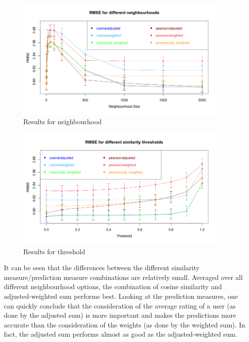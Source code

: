 \begin{figure}[!ht]
\centering
\includegraphics[width=400px]{./4-experiments/figures/USERBASED_N_V4.png}
\caption{Results for neighbourhood}
\label{f:userbasedn}
\end{figure}

\begin{figure}[!ht]
\includegraphics[width=400px]{./4-experiments/figures/USERBASED_T_V4.png}
\caption{Results for threshold}
\label{f:userbasedt}
\end{figure}

It can be seen that the differences between the different similarity measure/prediction measure combinations are relatively small. Averaged over all different neighbourhood options, the combination of cosine similarity and adjusted-weighted sum performs best. Looking at the prediction measures, one can quickly conclude that the consideration of the average rating of a user (as done by the adjusted sum) is more important and makes the predictions more accurate than the consideration of the weights (as done by the weighted sum). In fact, the adjusted sum performs almost as good as the adjusted-weighted sum.

